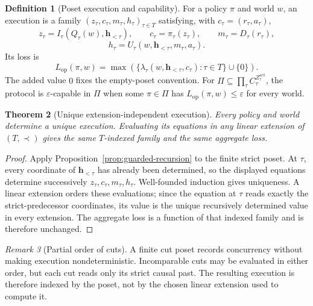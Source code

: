 \documentclass[11pt]{article}
\theoremstyle{plain}
\newtheorem{theorem}{Theorem}[section]
\theoremstyle{definition}
\newtheorem{definition}[theorem]{Definition}
\theoremstyle{remark}
\newtheorem{remark}[theorem]{Remark}
\newcommand{\eps}{\varepsilon}
\begin{document}
\begin{definition}[Poset execution and capability]
\label{def:operational-execution}
For a policy $\pi$ and world $w$, an execution is a family
$(z_\tau,c_\tau,m_\tau,h_\tau)_{\tau\in T}$ satisfying, with
$c_\tau=(r_\tau,a_\tau)$,
\[
z_\tau=I_\tau(Q_\tau(w),\mathbf h_{<\tau}),
\qquad c_\tau=\pi_\tau(z_\tau),
\qquad m_\tau=D_\tau(r_\tau),
\]
\[
h_\tau=U_\tau(w,\mathbf h_{<\tau},m_\tau,a_\tau).
\]
Its loss is
\[
L_{\mathrm{op}}(\pi,w)
=\max\left(
\{\lambda_\tau(w,\mathbf h_{<\tau},c_\tau):\tau\in T\}
\cup\{0\}\right).
\]
The added value $0$ fixes the empty-poset convention.
For $\Pi\subseteq\prod_\tau C_\tau^{Z_\tau^{\mathrm{act}}}$, the protocol is
$\eps$-capable in $\Pi$ when some $\pi\in\Pi$ has
$L_{\mathrm{op}}(\pi,w)\le\eps$ for every world.
\end{definition}

\begin{theorem}[Unique extension-independent execution]
\label{thm:operational-execution}
Every policy and world determine a unique execution. Evaluating its equations in
any linear extension of $(T,\prec)$ gives the same $T$-indexed family and the
same aggregate loss.
\end{theorem}

\begin{proof}
Apply Proposition~\ref{prop:guarded-recursion} to the finite strict poset. At
$\tau$, every
coordinate of $\mathbf h_{<\tau}$ has already been determined, so the displayed
equations determine successively $z_\tau,c_\tau,m_\tau,h_\tau$. Well-founded
induction gives uniqueness. A linear extension orders these evaluations;
since the equation at $\tau$ reads exactly the strict-predecessor coordinates,
its value is the unique recursively determined value in every extension. The
aggregate loss is a function of that indexed family and is therefore unchanged.
\end{proof}

\begin{remark}[Partial order of cuts]
A finite cut poset records concurrency without making execution nondeterministic.
Incomparable cuts may be evaluated in either order, but each cut reads only its
strict causal past. The resulting execution is therefore indexed by the poset,
not by the chosen linear extension used to compute it.
\end{remark}
\end{document}
